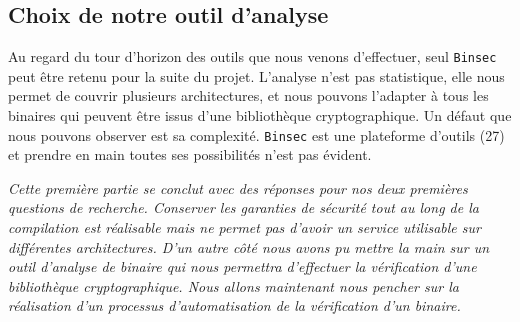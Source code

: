 \subsection*{Choix de notre outil d'analyse}

Au regard du tour d'horizon des outils que nous venons d'effectuer, seul \texttt{Binsec} peut être retenu pour la suite du projet. L'analyse n'est pas statistique, elle nous permet de couvrir plusieurs architectures, et nous pouvons l'adapter à tous les binaires qui peuvent être issus d'une bibliothèque cryptographique. Un défaut que nous pouvons observer est sa complexité. \texttt{Binsec} est une plateforme d'outils (27) et prendre en main toutes ses possibilités n'est pas évident.


\vfill
\textit{Cette première partie se conclut avec des réponses pour nos deux premières questions de recherche. Conserver les garanties de sécurité tout au long de la compilation est réalisable mais ne permet pas d'avoir un service utilisable sur différentes architectures. D'un autre côté nous avons pu mettre la main sur un outil d'analyse de binaire qui nous permettra d'effectuer la vérification d'une bibliothèque cryptographique. Nous allons maintenant nous pencher sur la réalisation d'un processus d'automatisation de la vérification d'un binaire.}